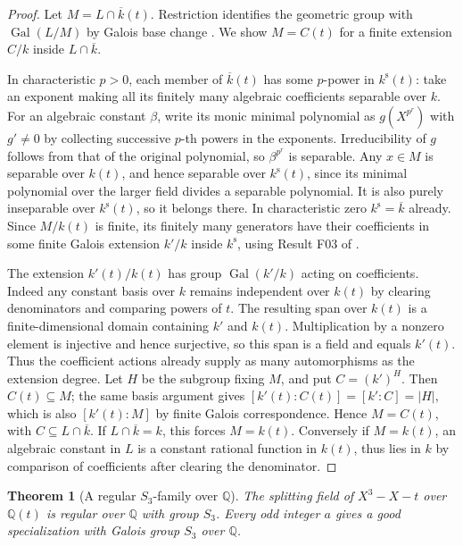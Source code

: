 \documentclass[11pt,oneside,openany]{book}
\newtheorem{theorem}{Theorem}[chapter]
\theoremstyle{definition}
\theoremstyle{remark}
\begin{document}
\begin{proof}
Let \(M=L\cap\overline k(t)\). Restriction identifies the geometric
group with \(\operatorname{Gal}(L/M)\) by Galois base change
\cite[Result C10]{mg-aft}. We show \(M=C(t)\) for a finite
extension \(C/k\) inside \(L\cap\overline k\).

In characteristic \(p>0\), each member of \(\overline k(t)\)
has some \(p\)-power in \(k^{\mathrm{s}}(t)\): take an exponent
making all its finitely many algebraic coefficients separable over
\(k\). For an algebraic constant \(\beta\), write its monic minimal
polynomial as \(g(X^{p^r})\) with \(g'\ne0\) by collecting successive
\(p\)-th powers in the exponents. Irreducibility of \(g\) follows
from that of the original polynomial, so \(\beta^{p^r}\) is
separable. Any \(x\in M\) is separable over \(k(t)\), and hence
separable over \(k^{\mathrm{s}}(t)\), since its minimal polynomial
over the larger field divides a separable polynomial. It is also
purely inseparable over \(k^{\mathrm{s}}(t)\), so it belongs there.
In characteristic zero \(k^{\mathrm{s}}=\overline k\) already.
Since \(M/k(t)\) is finite, its finitely many generators have
their coefficients in some finite Galois extension \(k'/k\)
inside \(k^{\mathrm{s}}\), using Result F03 of
\cite{mg-aft}.

The extension \(k'(t)/k(t)\) has group \(\operatorname{Gal}(k'/k)\)
acting on coefficients. Indeed any constant basis over \(k\)
remains independent over \(k(t)\) by clearing denominators and
comparing powers of \(t\). The resulting span over \(k(t)\)
is a finite-dimensional domain containing \(k'\) and \(k(t)\).
Multiplication by a nonzero element is injective and hence
surjective, so this span is a field and equals \(k'(t)\).
Thus the coefficient actions already supply as many automorphisms
as the extension degree. Let \(H\) be the subgroup fixing \(M\),
and put \(C=(k')^H\). Then \(C(t)\subseteq M\); the same
basis argument gives \([k'(t):C(t)]=[k':C]=|H|\), which is
also \([k'(t):M]\) by finite Galois correspondence. Hence
\(M=C(t)\), with \(C\subseteq L\cap\overline k\).
If \(L\cap\overline k=k\), this forces \(M=k(t)\).
Conversely if \(M=k(t)\), an algebraic constant in \(L\) is
a constant rational function in \(k(t)\), thus lies in \(k\)
by comparison of coefficients after clearing the denominator.
\end{proof}

\begin{theorem}[A regular \(S_3\)-family over \(\mathbb Q\)]
\label{res:IG13}
The splitting field of \(X^3-X-t\) over \(\mathbb Q(t)\)
is regular over \(\mathbb Q\) with group \(S_3\).
Every odd integer \(a\) gives a good specialization with
Galois group \(S_3\) over \(\mathbb Q\).
\end{theorem}
\end{document}
